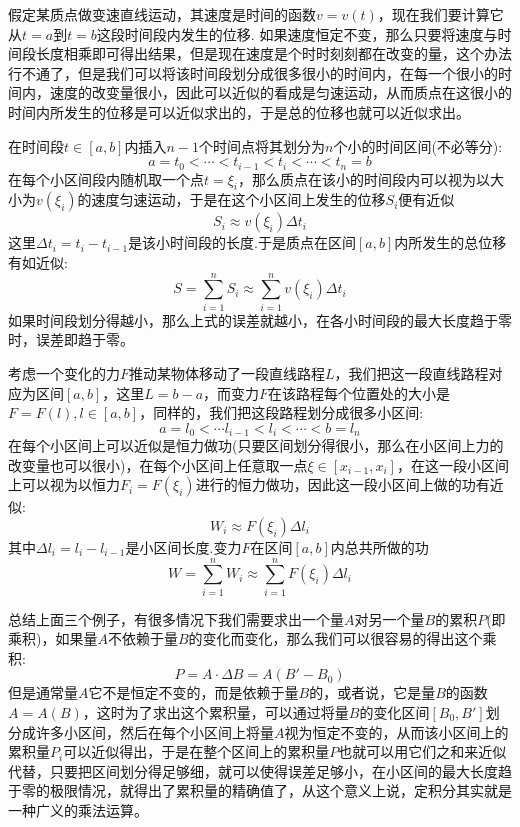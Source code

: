 \begin{example}[变速直线运动的位移]
  假定某质点做变速直线运动，其速度是时间的函数$v=v(t)$，现在我们要计算它从$t=a$到$t=b$这段时间段内发生的位移. 如果速度恒定不变，那么只要将速度与时间段长度相乘即可得出结果，但是现在速度是个时时刻刻都在改变的量，这个办法行不通了，但是我们可以将该时间段划分成很多很小的时间内，在每一个很小的时间内，速度的改变量很小，因此可以近似的看成是匀速运动，从而质点在这很小的时间内所发生的位移是可以近似求出的，于是总的位移也就可以近似求出。

  在时间段$t\in[a,b]$内插入$n-1$个时间点将其划分为$n$个小的时间区间(不必等分):
  \[ a = t_0 < \cdots < t_{i-1} < t_i < \cdots < t_n = b \]
  在每个小区间段内随机取一个点$t=\xi_i$，那么质点在该小的时间段内可以视为以大小为$v(\xi_i)$的速度匀速运动，于是在这个小区间上发生的位移$S_i$便有近似
  \[ S_i \approx v(\xi_i) \Delta t_i \]
  这里$\Delta t_i = t_i-t_{i-1}$是该小时间段的长度.于是质点在区间$[a,b]$内所发生的总位移有如近似:
  \[ S = \sum_{i=1}^n S_i \approx \sum_{i=1}^n v(\xi_i) \Delta t_i \]
  如果时间段划分得越小，那么上式的误差就越小，在各小时间段的最大长度趋于零时，误差即趋于零。
\end{example}

\begin{example}[变力做功]
  考虑一个变化的力$F$推动某物体移动了一段直线路程$L$，我们把这一段直线路程对应为区间$[a,b]$，这里$L=b-a$，而变力$F$在该路程每个位置处的大小是$F=F(l), l\in[a,b]$，同样的，我们把这段路程划分成很多小区间:
  \[ a = l_0 < \cdots l_{i-1} < l_i < \cdots < b = l_n \]
  在每个小区间上可以近似是恒力做功(只要区间划分得很小，那么在小区间上力的改变量也可以很小)，在每个小区间上任意取一点$\xi \in [x_{i-1},x_i]$，在这一段小区间上可以视为以恒力$F_i=F(\xi_i)$进行的恒力做功，因此这一段小区间上做的功有近似:
  \[ W_i \approx F(\xi_{i}) \Delta l_i \]
  其中$\Delta l_i = l_i-l_{i-1}$是小区间长度.变力$F$在区间$[a,b]$内总共所做的功
  \[ W = \sum_{i=1}^n W_i \approx \sum_{i=1}^n F(\xi_i) \Delta l_i \]
\end{example}

总结上面三个例子，有很多情况下我们需要求出一个量$A$对另一个量$B$的累积$P$(即乘积)，如果量$A$不依赖于量$B$的变化而变化，那么我们可以很容易的得出这个乘积:
\[ P = A \cdot \Delta B = A (B'-B_0) \]
但是通常量$A$它不是恒定不变的，而是依赖于量$B$的，或者说，它是量$B$的函数$A=A(B)$，这时为了求出这个累积量，可以通过将量$B$的变化区间$[B_0,B']$划分成许多小区间，然后在每个小区间上将量$A$视为恒定不变的，从而该小区间上的累积量$P_i$可以近似得出，于是在整个区间上的累积量$P$也就可以用它们之和来近似代替，只要把区间划分得足够细，就可以使得误差足够小，在小区间的最大长度趋于零的极限情况，就得出了累积量的精确值了，从这个意义上说，定积分其实就是一种广义的乘法运算。

